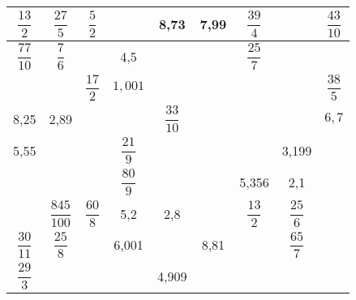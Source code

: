    \begin{center}
   {
   \footnotesize
      \begin{tabular}{|*{3}{C{0.9}|}|*{3}{C{0.9}|}|*{3}{C{0.9}|}}
         \hline
          \!$\dfrac{13}{2}$\! & $\dfrac{27}{5}$ & $\dfrac{5}{2}$ & & 8,73 & 7,99 & $\dfrac{39}{4}$ & & \!$\dfrac{43}{10}\!$ \\
         \hline
          $\dfrac{77}{10}$ & $\dfrac{7}{6}$ & & 4,5 & & & $\dfrac{25}{7}$ & & \\
         \hline
          & & $\dfrac{17}{2}$ & $1,001$ & & & & & $\dfrac{38}{5}$\\
          \hline
          ,25 & 2,89 & & & $\dfrac{33}{10}$ & & & & $6,7$ \\
          ,55 & & & $\dfrac{21}{9}$ & & & & 3,199 & \\
         \hline
          & & & $\dfrac{80}{9}$ & & & 5,356 & 2,1 & \\
         \hline
         \hline
          & $\dfrac{845}{100}$ & $\dfrac{60}{8}$ & 5,2 & 2,8 & & $\dfrac{13}{2}$ & $\dfrac{25}{6}$ & \\
         \hline
          \!$\dfrac{30}{11}$\! & $\dfrac{25}{8}$ & & 6,001 & & 8,81 & & $\dfrac{65}{7}$ & \\
         \hline
          $\dfrac{29}{3}$ & & & & 4,909 & & & & \\
         \hline
      \end{tabular}}
   \end{center}


